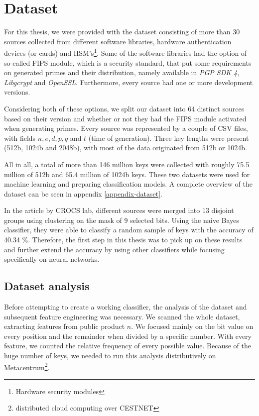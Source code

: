 \chapter{Dataset}
\label{chapter-dataset}

For this thesis, we were provided with the dataset consisting of more than 30 sources collected from different software libraries, hardware authentication devices (or cards) and HSM's\footnote{Hardware security modules}. 
Some of the software libraries had the option of so-called FIPS module, which is a security standard, that put some requirements on generated primes and their distribution, namely available in \textit{PGP SDK 4}, \textit{Libgcrypt} and \textit{OpenSSL}. Furthermore, every source had one or more development versions. 

Considering both of these options, we split our dataset into 64 distinct sources based on their version and whether or not they had the FIPS module activated when generating primes. Every source was represented by a couple of CSV files, with fields $n, e, d, p, q$ and $t$ (time of generation). Three key lengths were present (512b, 1024b and 2048b), with most of the data originated from 512b or 1024b.

All in all, a total of more than 146 million keys were collected with roughly 75.5 million of 512b and 65.4 million of 1024b keys. These two datasets were used for machine learning and preparing classification models. A complete overview of the dataset can be seen in appendix \ref{appendix-dataset}.

In the article by CROCS lab\cite{svenda_1}, different sources were merged into 13 disjoint groups using clustering on the mask of 9 selected bits. Using the naive Bayes classifier, they were able to classify a random sample of keys with the accuracy of 40.34 \%. Therefore, the first step in this thesis was to pick up on these results and further extend the accuracy by using other classifiers while focusing specifically on neural networks.

\section{Dataset analysis}

\label{chapter-analysis}

Before attempting to create a working classifier, the analysis of the dataset and subsequent feature engineering was necessary. We scanned the whole dataset, extracting features from public product $n$. We focused mainly on the bit value on every position and the remainder when divided by a specific number. With every feature, we counted the relative frequency of every possible value. Because of the huge number of keys, we needed to run this analysis distributively on Metacentrum\footnote{distributed cloud computing over CESTNET}.

